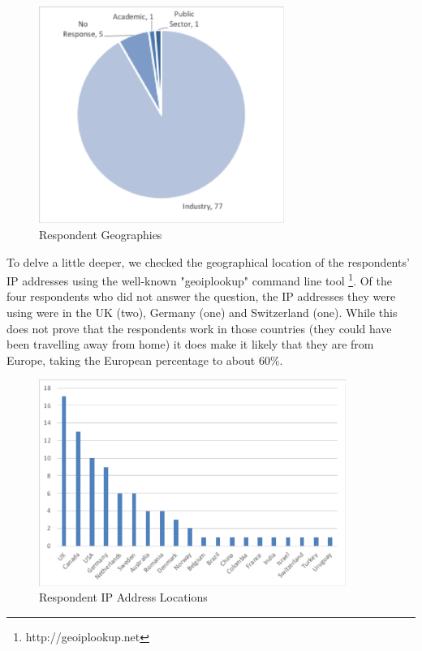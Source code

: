 \begin{figure}
\centering
\includegraphics[width=8cm,trim={2 2 2 2},clip]{Figures/prioritisation-workenv}
\caption{Respondent Geographies}
\label{figure:geographies}
\end{figure}

To delve a little deeper, we checked the geographical location of the respondents' IP addresses using the well-known "geoiplookup" command line tool \footnote{http://geoiplookup.net}.  Of the four respondents who did not answer the question, the IP addresses they were using were in the UK (two), Germany (one) and Switzerland (one).  While this does not prove that the respondents work in those countries (they could have been travelling away from home) it does make it likely that they are from Europe, taking the European percentage to about 60\%.
 
\begin{figure}
\centering
\includegraphics[width=10cm,trim={2 2 2 2},clip]{Figures/prioritisation-iplocation}
\caption{Respondent IP Address Locations}
\label{figure:iplocations}
\end{figure}

